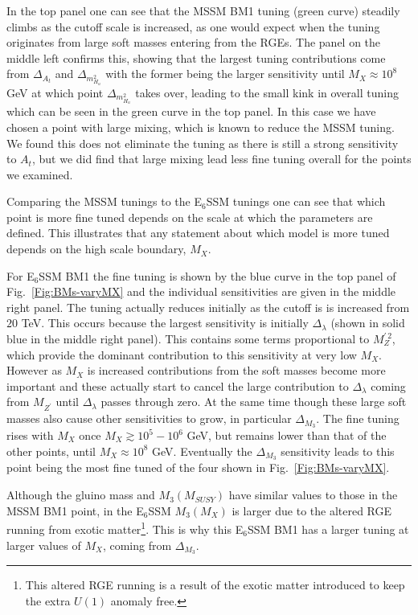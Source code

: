 \documentclass[preprint,amsmath,amssymb,aps,superscriptaddress,prd,showpacs,floatfix,nofootinbib]{revtex4-1}
\begin{document}
In the top panel one can see that the MSSM BM1 tuning (green curve) 
steadily climbs as the cutoff scale is increased, as one would expect
when the tuning originates from large soft masses entering from the
RGEs. The panel on the middle left confirms this, showing that the
largest tuning contributions come from $\Delta_{A_t}$ and
$\Delta_{m_{H_u}^2}$ with the former being the larger sensitivity
until $M_X\approx 10^8$ GeV at which point $\Delta_{m_{H_u}^2}$ takes
over, leading to the small kink in overall tuning which can be seen in
the green curve in the top panel. In this case we have chosen a
point with large mixing, which is known to reduce the MSSM tuning.  We
found this does not eliminate the tuning as there is still a strong
sensitivity to $A_t$, but we did find that large mixing lead less
fine tuning overall for the points we examined.  

Comparing the MSSM tunings to the E$_6$SSM tunings one can see that
which point is more fine tuned depends on the scale at which the
parameters are defined.  This illustrates that any statement about
which model is more tuned depends on the high scale boundary, $M_X$.

For E$_6$SSM BM1 the fine tuning is shown by the blue curve in the top
panel of Fig.~\ref{Fig:BMs-varyMX} and the individual sensitivities
are given in the middle right panel. The tuning actually reduces
initially as the cutoff is is increased from $20$ TeV.  This occurs
because the largest sensitivity is initially $\Delta_\lambda$ (shown
in solid blue in the middle right panel).  This contains some terms
proportional to $M_Z^{\prime \, 2}$, which provide the dominant
contribution to this sensitivity at very low $M_X$.  However as $M_X$
is increased contributions from the soft masses become more important
and these actually start to cancel the large contribution to
$\Delta_\lambda$ coming from $M_{Z^\prime}$ until $\Delta_\lambda$
passes through zero.  At the same time though these large soft masses
also cause other sensitivities to grow, in particular $\Delta_{M_3}$.
The fine tuning rises with $M_X$ once $M_X \gtrsim 10^5-10^6$ GeV, but
remains lower than that of the other points, until $M_X \approx 10^8$
GeV.  Eventually the $\Delta_{M_3}$ sensitivity leads to this point
being the most fine tuned of the four shown in
Fig.~\ref{Fig:BMs-varyMX}.

 Although the gluino mass and $M_3(M_{SUSY})$ have similar values to
 those in the MSSM BM1 point, in the E$_6$SSM $M_3(M_X)$ is larger due
 to the altered RGE running from exotic matter\footnote{This altered
   RGE running is a result of the exotic matter introduced to keep the
   extra $U(1)$ anomaly free. }. This is why this E$_6$SSM BM1 has a
 larger tuning at larger values of $M_X$, coming from
 $\Delta_{M_3}$.
\end{document}
